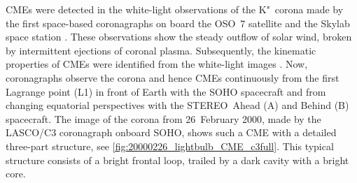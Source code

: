 CMEs were detected in the white-light observations of the K"~corona made by the first space-based coronagraphs on board the OSO~7 satellite \citep{Tousey1973} and the Skylab space station \citep{MacQueen1974}. These observations show the steady outflow of solar wind, broken by intermittent ejections of coronal plasma. Subsequently, the kinematic properties of CMEs were identified from the white-light images \citep{MacQueen1980}. Now, coronagraphs observe the corona and hence CMEs continuously from the first Lagrange point (L1) in front of Earth with the SOHO spacecraft and from changing equatorial perspectives with the STEREO~Ahead (A) and Behind (B) spacecraft. The image of the corona from 26~February 2000, made by the LASCO/C3 coronagraph onboard SOHO, shows such a CME with a detailed three-part structure, see \autoref{fig:20000226_lightbulb_CME_c3full}. This typical structure consists of a bright frontal loop, trailed by a dark cavity with a bright core.
